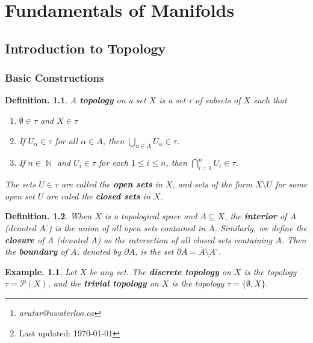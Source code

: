 \documentclass[11pt, a4paper]{memoir}
\title{\subject}
\author{Alex Rutar\thanks{\itshape arutar@uwaterloo.ca}\\ University of Waterloo}
\date{\semester\thanks{Last updated: \today}}
\DeclareMathOperator{\N}{{\mathbb{N}}}
\theoremstyle{change}
\theoremstyle{plain}
\theoremstyle{nonumberplain}
\newtheorem{definition}{Definition.}
\newtheorem{example}{Example.}
\numberwithin{equation}{section}
\begin{document}
\hypersetup{pageanchor=false}
\maketitle
\newpage
\frontmatter
\hypersetup{pageanchor=true}
\tableofcontents*
\newpage
\mainmatter


\chapter{Fundamentals of Manifolds}
\section{Introduction to Topology}
\subsection{Basic Constructions}
\begin{definition}
    A \textbf{topology} on a set $X$ is a set $\tau$ of subsets of $X$ such that
    \begin{enumerate}[nl,r]
        \item $\emptyset\in\tau$ and $X\in\tau$
        \item If $U_\alpha\in\tau$ for all $\alpha\in A$, then $\bigcup_{\alpha\in A}U_\alpha\in\tau$.
        \item If $n\in\N$ and $U_i\in\tau$ for each $1\leq i\leq n$, then $\bigcap_{i=1}^n U_i\in\tau$.
    \end{enumerate}
    The sets $U\in\tau$ are called the \textbf{open sets} in $X$, and sets of the form $X\setminus U$ for some open set $U$ are caled the \textbf{closed sets} in $X$.
\end{definition}
\begin{definition}
    When $X$ is a topological space and $A\subseteq X$, the \textbf{interior} of $A$ (denoted $A^\circ$) is the union of all open sets contained in $A$.
    Similarly, we define the \textbf{closure} of $A$ (denoted $\overline{A}$) as the intersction of all closed sets containing $A$.
    Then the \textbf{boundary} of $A$, denoted by $\partial A$, is the set $\partial A=\overline{A}\setminus A^\circ$.
\end{definition}
\begin{example}
    Let $X$ be any set.
    The \textbf{discrete topology} on $X$ is the topology $\tau=\mathcal{P}(X)$, and the \textbf{trivial topology} on $X$ is the topology $\tau=\{\emptyset,X\}$.
\end{example}
\end{document}
